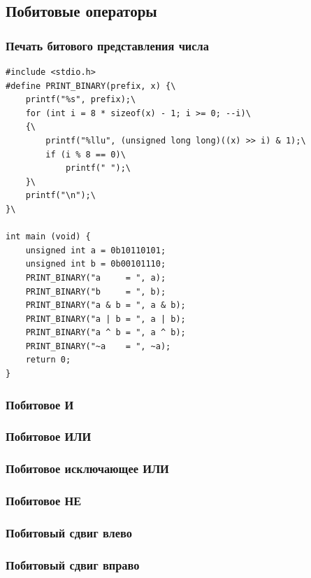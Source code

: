 \documentclass{article}
\begin{document}
\newpage
\subsection*{Побитовые операторы}
\subsubsection*{Печать битового представления числа}
\begin{lstlisting}
#include <stdio.h>
#define PRINT_BINARY(prefix, x) {\
    printf("%s", prefix);\
    for (int i = 8 * sizeof(x) - 1; i >= 0; --i)\
    {\
        printf("%llu", (unsigned long long)((x) >> i) & 1);\
        if (i % 8 == 0)\
            printf(" ");\
    }\
    printf("\n");\
}\

int main (void) {
    unsigned int a = 0b10110101;
    unsigned int b = 0b00101110;
    PRINT_BINARY("a     = ", a);
    PRINT_BINARY("b     = ", b);
    PRINT_BINARY("a & b = ", a & b);
    PRINT_BINARY("a | b = ", a | b);
    PRINT_BINARY("a ^ b = ", a ^ b);
    PRINT_BINARY("~a    = ", ~a);
    return 0;
}
\end{lstlisting}

\subsubsection*{Побитовое И}
\subsubsection*{Побитовое ИЛИ}
\subsubsection*{Побитовое исключающее ИЛИ}
\subsubsection*{Побитовое НЕ}
\subsubsection*{Побитовый сдвиг влево}
\subsubsection*{Побитовый сдвиг вправо}


\newpage
\end{document}
